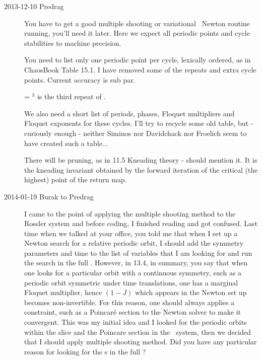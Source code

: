 \begin{description}


\item[2013-12-10 Predrag] You have to get a good multiple shooting
or variational \rpo\ Newton
routine running, you'll need it later. Here we expect all periodic
points and cycle stabilities to machine precision.

You need to list only one periodic point per cycle, lexically
ordered, as in ChaosBook
{Table 15.1}. I have removed some of the repeats and extra
cycle points. Current accuracy is sub par.

 = $^3$ is the third repeat of .

We also need a short list of periods, phases, Floquet multipliers
and Floquet exponents for these cycles. I'll try to recycle some
old table, but - curiously enough - neither Siminos nor Davidchack nor
Froelich seem to have created such a table...


There will be pruning, as in
{11.5 Kneading theory} - should mention it. It is the kneading invariant
obtained by the forward iteration of the critical (the highest) point of
the return map.

\item[2014-01-19 Burak to Predrag] I came to the point of applying the multiple
shooting method to the Rossler system and before coding, I finished reading
and got confused. Last time when we talked at your office, you told me that
when I set up a Newton search for a relative periodic orbit, I should add the
symmetry parameters and time to the list of variables that I am looking for
and run the search in the full \statesp . However, in 13.4, in summary, you
say that when one looks for a particular orbit with a continuous symmetry, such
as a periodic orbit symmetric under time translations, one has a marginal
Floquet multiplier, hence  $(1 - J)$ which appears in the Newton set up becomes
non-invertible. For this reason, one should always applies a constraint, such
as a Poincar\'e section to the Newton solver to make it convergent. This was
my initial idea and I looked for the periodic orbits within the slice and the
Poincare section in the \twomode\ system, then we decided that I should apply
multiple shooting method. Did you have any particular reason for looking for the
\rpo s in the full \statesp ?


\end{description}

